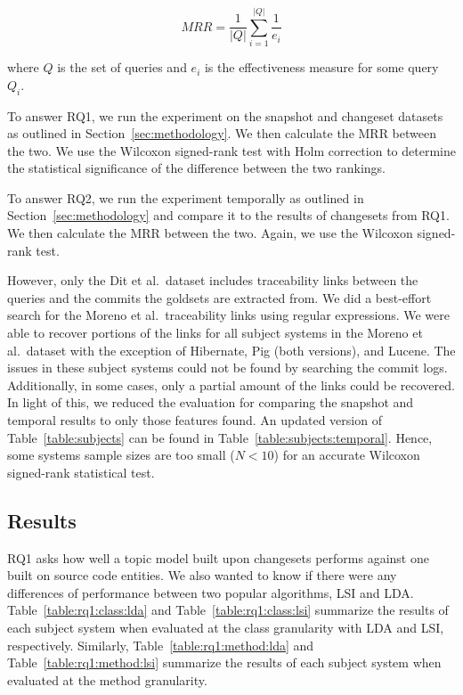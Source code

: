 \begin{equation}
    MRR = \frac{1}{|Q|} \sum_{i=1}^{|Q|} \frac{1}{e_i}
\end{equation}

where $Q$ is the set of queries
and $e_i$ is the effectiveness measure for some query $Q_i$.

To answer RQ1, we run the experiment on the snapshot and changeset
datasets as outlined in Section~\ref{sec:methodology}.
We then calculate the MRR between the two.
We use the Wilcoxon signed-rank test with Holm correction to determine
the statistical significance of the difference between the two rankings.

To answer RQ2, we run the experiment temporally as outlined in Section~\ref{sec:methodology}
and compare it to the results of changesets from RQ1.
We then calculate the MRR between the two.
Again, we use the Wilcoxon signed-rank test.

However, only the Dit et al.\ dataset includes traceability links between
the queries and the commits the goldsets are extracted from.
We did a best-effort search for the Moreno et al.\ traceability links using regular expressions.
We were able to recover portions of the links for all subject systems in
the Moreno et al.\ dataset with the exception of Hibernate, Pig (both versions), and Lucene.
The issues in these subject systems could not be found by searching the commit logs.
Additionally, in some cases, only a partial amount of the links could be
recovered. In light of this, we reduced the evaluation for comparing the
snapshot and temporal results to only those features found.
An updated version of Table~\ref{table:subjects} can be found in Table~\ref{table:subjects:temporal}.
Hence, some systems sample sizes are too small ($N<10$) for an accurate Wilcoxon signed-rank statistical test.




\subsection{Results}






RQ1 asks how well a topic model built upon changesets performs against
one built on source code entities.
We also wanted to know if there were any differences of performance
between two popular algorithms, LSI and LDA.
Table~\ref{table:rq1:class:lda} and Table~\ref{table:rq1:class:lsi}
summarize the results of each subject system when
evaluated at the class granularity with LDA and LSI, respectively.
Similarly, Table~\ref{table:rq1:method:lda} and Table~\ref{table:rq1:method:lsi}
summarize the results of each subject system when
evaluated at the method granularity.

